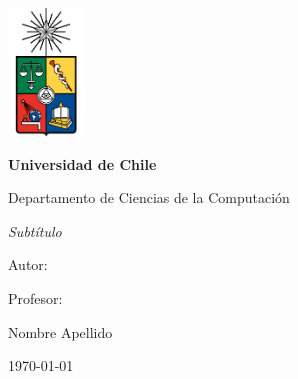 
\thispagestyle{empty}
\begin{center}
    {\includegraphics[width=0.15\textwidth]{src/img/university/uchile2.pdf}\par}
    \vspace{1cm}
    {\bfseries\Large Universidad de Chile \par}
    {\large Departamento de Ciencias de la Computación \par}
    \vspace{2cm}
    {\scshape\Large \thetitle \par}
    {\itshape\large Subtítulo \par}
    {\large \curso \par}
    \vspace{1cm}
    {Autor: \par}
    {\theauthor \par}
    \vspace{1cm}
    {Profesor: \par}
    {Nombre Apellido \par}
    \vfill
    {\large \today \par}
\end{center}
\newpage